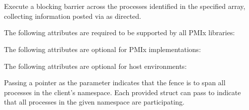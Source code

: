 \section{}

\summary

Execute a blocking barrier across the processes identified in the specified array, collecting information posted via  as directed.

\format


\begin{arglist}
\end{arglist}

\returnsimple

\reqattrstart
The following attributes are required to be supported by all \ac{PMIx} libraries:


\reqattrend

\optattrstart
The following attributes are optional for \ac{PMIx} implementations:



The following attributes are optional for host environments:


\optattrend

\descr

Passing a  pointer as the  parameter indicates that the fence is to span all processes in the client's namespace.
Each provided  struct can pass  to indicate that all processes in the given namespace are participating.

